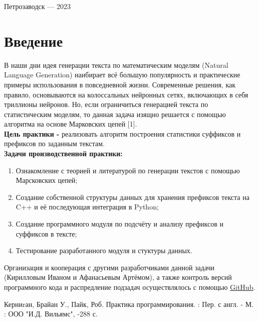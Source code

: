 \documentclass[a4paper,12pt]{article}
\begin{document}
\vfill

\begin{center}
\large
    Петрозаводск --- 2023
\end{center}

\newpage
\tableofcontents

\newpage
\section*{Введение}
В наши дни идея генерации текста по математическим моделям (Natural Language Generation) наибирает всё большую популярность и практические примеры использования в повседневной жизни. Современные решения, как правило, основываются на колоссальных нейронных сетях, включающих в себя триллионы нейронов. Но, если ограничиться генерацией текста по статистическим моделям, то данная задача изящно решается с помощью алгоритма на основе Марковских цепей [1].	\\

	\textbf{Цель практики - } реализовать алгоритм построения статистики суффиксов и префиксов по заданным текстам.\\

	\textbf{Задачи производственной практики:}
\begin{enumerate}
	\item {Ознакомление с теорией и литературой по генерации текстов с помощью Марсковских цепей;}
	\item {Создание собственной структуры данных для хранения префиксов текста на C++ и её последующая интеграция в Python;}
	\item {Создание программного модуля по подсчёту и анализу префиксов и суффиксов в тексте;}
	\item {Тестирование разработанного модуля и стуктуры данных.}
\end{enumerate}

	Организация и кооперация с другими разработчиками данной задачи (Кирилловым Иваном и Афанасьевым Артёмом), а также контроль версий программного кода и распредление подзадач осуществлялось с помощью \href{https://github.com/Flexagen/Construction-of-suffix-and-prefix-statistics}{GitHub}.


\newpage
{}
\begin{thebibliography}{}
	\bibitem{} {Керниrан, Брайан У., Пайк, Роб. Практика программирования. : Пер. с англ. - М. : ООО "И.Д. Вильямс", -288 с.}
\end{thebibliography}
\end{document}
